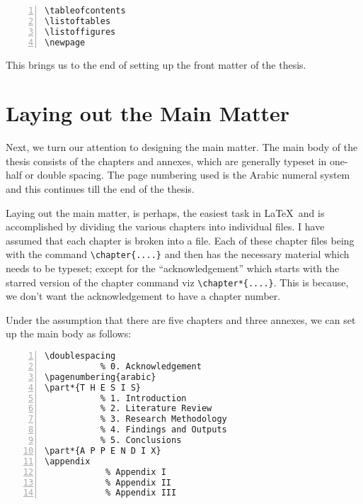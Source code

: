 \documentclass{pracjourn}
\begin{document}
\begin{Verbatim}[frame=lines, xleftmargin=2mm, framesep=2mm, numbers=left, firstnumber=last]
\tableofcontents
\listoftables
\listoffigures
\newpage
\end{Verbatim}

This brings us to the end of setting up the front matter of the thesis.

\section{Laying out the Main Matter}

Next, we turn our attention to designing the main matter. The main body of the
thesis consists of the chapters and annexes, which are generally typeset in
one-half or double spacing. The page numbering used is the Arabic numeral
system and this continues till the end of the thesis.

Laying out the main matter, is perhaps, the easiest task in \LaTeX\ and is
accomplished by dividing the various  chapters into individual files. I have
assumed that each chapter is broken into a file. Each of these chapter files
being with the command \verb|\chapter{....}| and then has the necessary
material which needs to be typeset; except for the ``acknowledgement'' which
starts with the starred version of the chapter command viz
\verb|\chapter*{....}|. This is because, we don't want the acknowledgement to
have a chapter number.

Under the assumption that there are five chapters and three annexes, we can set
up the main body as follows:

\begin{Verbatim}[frame=lines, xleftmargin=2mm, framesep=2mm, numbers=left, firstnumber=last]
\doublespacing
           % 0. Acknowledgement
\pagenumbering{arabic}
\part*{T H E S I S}
           % 1. Introduction
           % 2. Literature Review
           % 3. Research Methodology
           % 4. Findings and Outputs
           % 5. Conclusions
\part*{A P P E N D I X}
\appendix
            % Appendix I
            % Appendix II
            % Appendix III
\end{Verbatim}
\end{document}
